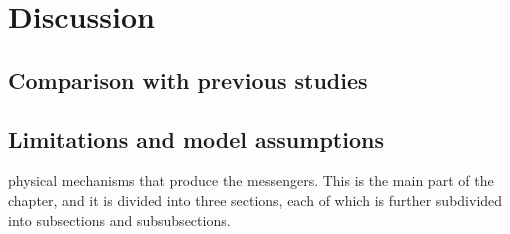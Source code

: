 


\chapter{Discussion}\label{ch:discussion}
\section{Comparison with previous studies}
\section{Limitations and model assumptions}



physical mechanisms that produce the messengers. This is the main part of the chapter, and it is divided into three sections, each of which is further subdivided into subsections and subsubsections.




